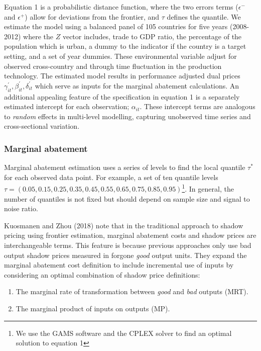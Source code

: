 \documentclass[
  10pt,
]{article}
\providecommand{\tightlist}{%
  \setlength{\itemsep}{0pt}\setlength{\parskip}{0pt}}
\begin{document}
Equation 1 is a probabilistic distance function, where the two errors
terms (\(\epsilon^-\) and \(\epsilon^+\)) allow for deviations from the
frontier, and \(\tau\) defines the quantile. We estimate the model using
a balanced panel of 105 countries for five years (2008-2012) where the
\(Z\) vector includes, trade to GDP ratio, the percentage of the
population which is urban, a dummy to the indicator if the country is a
target setting, and a set of year dummies. These environmental variable
adjust for observed cross-country and through time fluctuation in the
production technology. The estimated model results in performance
adjusted dual prices \(\gamma^{'}_{it},\beta^{'}_{it} ,\delta^{'}_{it}\)
which serve as inputs for the marginal abatement calculations. An
additional appealing feature of the specification in equation 1 is a
separately estimated intercept for each observation; \(\alpha_{it}\).
These intercept terms are analogous to \emph{random} effects in
multi-level modelling, capturing unobserved time series and
cross-sectional variation.

\hypertarget{marginal-abatement}{%
\subsubsection{Marginal abatement}\label{marginal-abatement}}

Marginal abatement estimation uses a series of levels to find the local
quantile \(\tau^{*}\) for each observed data point. For example, a set
of ten quantile levels
\(\tau=(0.05,0.15,0.25,0.35,0.45,0.55,0.65,0.75,0.85,0.95)\)\footnote{We
  use the GAMS software and the CPLEX solver to find an optimal solution
  to equation 1}. In general, the number of quantiles is not fixed but
should depend on sample size and signal to noise ratio.

Kuosmanen and Zhou (2018) note that in the traditional approach to
shadow pricing using frontier estimation, marginal abatement costs and
shadow prices are interchangeable terms. This feature is because
previous approaches only use bad output shadow prices measured in
forgone \emph{good} output units. They expand the marginal abatement
cost definition to include incremental use of inputs by considering an
optimal combination of shadow price definitions:

\begin{enumerate}
\def\labelenumi{\arabic{enumi}.}
\tightlist
\item
  The marginal rate of transformation between \emph{good} and \emph{bad}
  outputs (MRT).\\
\item
  The marginal product of inputs on outputs (MP).
\end{enumerate}
\end{document}
